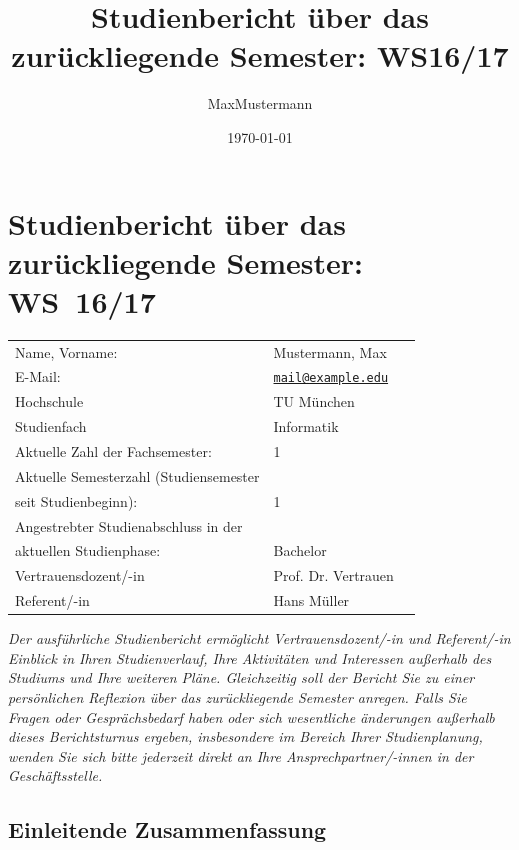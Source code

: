 \documentclass[a4paper,10pt]{article}
\makeatletter
\newcommand{\Jahr}{16/17}
\newcommand{\Semester}{WS}
\newcommand{\Datum}{\today}
\newcommand{\Semesteranzahl}{1}
\newcommand{\Abschluss}{Bachelor}
\newcommand{\Studienfach}{Informatik}
\newcommand{\University}{TU München}
\newcommand{\Nachname}{Mustermann}
\newcommand{\Vorname}{Max}
\newcommand{\Email}{mail@example.edu}
\newcommand{\Vertrauensdozent}{Prof. Dr. Vertrauen}
\newcommand{\Referent}{Hans Müller}
\makeatother
\begin{document}
    \setcounter{secnumdepth}{-1}

    \title{Studienbericht über das zurückliegende Semester: \Semester \Jahr}
    \author{\Vorname \Nachname}
    \date{\Datum}

    \section{Studienbericht über das zurückliegende Semester: \Semester~\Jahr}

    \begin{tabularx}{\textwidth}{@{}llX}
        Name, Vorname: & \Nachname, \Vorname \\
        E-Mail: &\href{mailto:\Email}{\nolinkurl{\Email} } \\
        Hochschule & \University \\
        Studienfach & \Studienfach \\
        Aktuelle Zahl der Fachsemester: & \Semesteranzahl \\
        Aktuelle Semesterzahl
        (Studiensemester\\ seit Studienbeginn): & \Semesteranzahl \\
        Angestrebter Studienabschluss in der \\
        aktuellen Studienphase: & \Abschluss \\
        Vertrauensdozent/-in & \Vertrauensdozent \\
        Referent/-in & \Referent \\
    \end{tabularx}

    \small{\emph{Der ausführliche Studienbericht ermöglicht Vertrauensdozent/-in und Referent/-in Einblick in Ihren Studienverlauf, Ihre Aktivitäten und Interessen außerhalb des Studiums und Ihre weiteren Pläne. Gleichzeitig soll der Bericht Sie zu einer persönlichen Reflexion über das zurückliegende Semester anregen. Falls Sie Fragen oder Gesprächsbedarf haben oder sich wesentliche änderungen außerhalb dieses Berichtsturnus ergeben, insbesondere im Bereich Ihrer Studienplanung, wenden Sie sich bitte jederzeit direkt an Ihre Ansprechpartner/-innen in der Geschäftsstelle.}} \normalsize
    \subsection{Einleitende Zusammenfassung}
\end{document}
